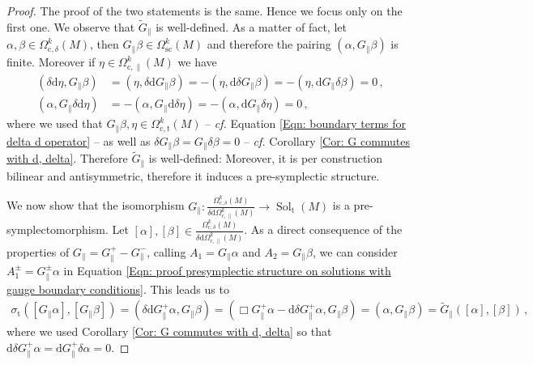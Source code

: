 \begin{proof}
	The proof of the two statements is the same. Hence we focus only on the first one. We observe that $\widetilde{G}_\parallel$ is well-defined.
	As a matter of fact, let $\alpha,\beta\in\Omega_{\mathrm{c},\delta}^k(M)$, then $G_\parallel\beta\in\Omega_{\mathrm{sc}}^k(M)$ and therefore the pairing $(\alpha,G_\parallel\beta)$ is finite.
	Moreover if $\eta\in\Omega_{\mathrm{c},\parallel}^k(M)$ we have
	\begin{align*}
	(\delta\mathrm{d}\eta,G_\parallel\beta)&=
	(\eta,\delta\mathrm{d}G_\parallel\beta)=
	-(\eta,\mathrm{d}\delta G_\parallel\beta)=
	-(\eta,\mathrm{d}G_\parallel\delta\beta)=0\,,\\
	(\alpha,G_\parallel\delta\mathrm{d}\eta)&=
	-(\alpha,G_\parallel\mathrm{d}\delta\eta)=
	-(\alpha,\mathrm{d}G_\parallel\delta\eta)=0\,,
	\end{align*}
	where we used that $G_\parallel\beta,\eta\in\Omega_{\mathrm{c},\mathrm{t}}^k(M)$ -- \textit{cf.} Equation \eqref{Eqn: boundary terms for delta d operator} -- as well as $\delta G_\parallel\beta=G_\parallel\delta\beta=0$ -- \textit{cf.} Corollary \ref{Cor: G commutes with d, delta}.
	Therefore $\widetilde{G}_\parallel$ is well-defined: Moreover, it is per construction bilinear and antisymmetric, therefore it induces a pre-symplectic structure.
	
	We now show that the isomorphism $G_\parallel\colon\frac{\Omega_{\mathrm{c},\delta}^k(M)}{\delta\mathrm{d}\Omega_{\mathrm{c},\parallel}^k(M)}\to\operatorname{Sol}_{\mathrm{t}}(M)$ is a pre-symplectomorphism. Let $[\alpha],[\beta]\in\frac{\Omega^k_{\mathrm{c},\delta}(M)}{\delta\mathrm{d}\Omega_{\mathrm{c},\parallel}^k(M)}$.
	As a direct consequence of the properties of $G_\parallel=G_\parallel^+-G_\parallel^-$, calling $A_1=G_\parallel\alpha$ and $A_2=G_\parallel\beta$, we can consider $A_1^\pm=G_\parallel^\pm\alpha$ in Equation \eqref{Eqn: proof presymplectic structure on solutions with gauge boundary conditions}.
	This leads us to
	\begin{align*}
	\sigma_{\mathrm{t}}([G_\parallel\alpha],[G_\parallel\beta])=
	(\delta\mathrm{d}G_\parallel^+\alpha,G_\parallel\beta)=
	(\Box G_\parallel^+\alpha-\mathrm{d}\delta G_\parallel^+\alpha,G_\parallel\beta)=
	(\alpha,G_\parallel\beta)=
	\widetilde{G}_\parallel([\alpha],[\beta])\,,
	\end{align*}
	where we used Corollary \ref{Cor: G commutes with d, delta} so that $\mathrm{d}\delta G_\parallel^+\alpha=\mathrm{d}G_\parallel^+\delta\alpha=0$.
\end{proof}


